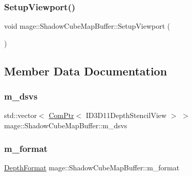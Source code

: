 \subsubsection{\texorpdfstring{Setup\+Viewport()}{SetupViewport()}}
{\footnotesize\ttfamily void mage\+::\+Shadow\+Cube\+Map\+Buffer\+::\+Setup\+Viewport (\begin{DoxyParamCaption}{ }\end{DoxyParamCaption})\hspace{0.3cm}{\ttfamily [private]}}



\subsection{Member Data Documentation}
\hypertarget{structmage_1_1_shadow_cube_map_buffer_ad8a493d831b8ecd08d18fa1a3312143b}{}\label{structmage_1_1_shadow_cube_map_buffer_ad8a493d831b8ecd08d18fa1a3312143b} 
\subsubsection{\texorpdfstring{m\+\_\+dsvs}{m\_dsvs}}
{\footnotesize\ttfamily std\+::vector$<$ \hyperlink{namespacemage_ae74f374780900893caa5555d1031fd79}{Com\+Ptr}$<$ I\+D3\+D11\+Depth\+Stencil\+View $>$ $>$ mage\+::\+Shadow\+Cube\+Map\+Buffer\+::m\+\_\+dsvs\hspace{0.3cm}{\ttfamily [private]}}

\hypertarget{structmage_1_1_shadow_cube_map_buffer_ada9a7c895a74303904f9884b986c935f}{}\label{structmage_1_1_shadow_cube_map_buffer_ada9a7c895a74303904f9884b986c935f} 
\subsubsection{\texorpdfstring{m\+\_\+format}{m\_format}}
{\footnotesize\ttfamily \hyperlink{namespacemage_aed4c3f883a30484d0a20762c06be81d4}{Depth\+Format} mage\+::\+Shadow\+Cube\+Map\+Buffer\+::m\+\_\+format\hspace{0.3cm}{\ttfamily [private]}}


